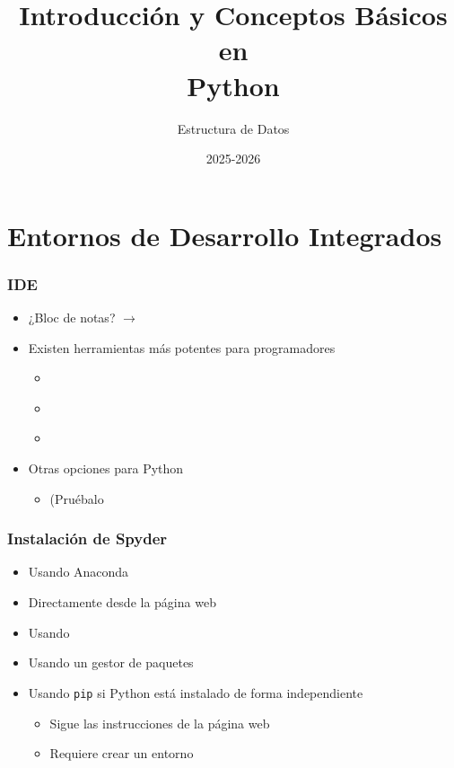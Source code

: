 \documentclass[11pt]{beamer}
\author{Estructura de Datos}
\title{\huge{Introducción y Conceptos Básicos en \\Python}}
\date[]{2025-2026}
\begin{document}
\begin{frame}[plain]
	\maketitle
\end{frame}

\begin{frame}
	\tableofcontents
\end{frame}

\section{Entornos de Desarrollo Integrados}

\begin{frame}\frametitle{IDE}
\begin{itemize}
\item ¿Bloc de notas? $\rightarrow$ \href{https://notepad-plus-plus.org/}{}
\item Existen herramientas más potentes para programadores
    \begin{itemize}
    \item \href{https://docs.python.org/3/library/idle.html}{}
    \item \href{https://www.spyder-ide.org/}{}
    \item \href{https://www.jetbrains.com/pycharm/}{}
    \end{itemize}
\item Otras opciones para Python
    \begin{itemize}
    \item \href{https://jupyter.org/install}{} (Pruébalo \href{https://jupyter.org/try-jupyter/lab/?path=notebooks\%252FIntro.ipynb}{}
    \end{itemize}
\end{itemize}
\end{frame}

\begin{frame}\frametitle{Instalación de Spyder}
\begin{itemize}
\item Usando Anaconda
\item Directamente desde la página web
\item Usando \href{https://winpython.github.io/}{}
\item Usando un gestor de paquetes
\item Usando \lstinline|pip| si Python está instalado de forma independiente
    \begin{itemize}
        \item Sigue las instrucciones de la página web
        \item Requiere crear un entorno
    \end{itemize}
\end{itemize}
\end{frame}
\end{document}
